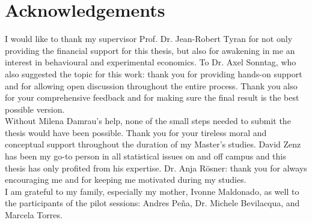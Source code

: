 \chapter*{Acknowledgements}

 I would like to thank my supervisor Prof. Dr. Jean-Robert Tyran for not only providing the financial support for this thesis, but also for awakening in me an interest in behavioural and experimental economics. To Dr. Axel Sonntag, who also suggested the topic for this work: thank you for providing hands-on support and for allowing open discussion throughout the entire process. Thank you also for your comprehensive feedback and for making sure the final result is the best possible version.\\

Without Milena Damrau’s help, none of the small steps needed to submit the thesis would have been possible. Thank you for your tireless moral and conceptual support throughout the duration of my Master’s studies. David Zenz has been my go-to person in all statistical issues on and off campus and this thesis has only profited from his expertise. Dr. Anja Rösner: thank you for always encouraging me and for keeping me motivated during my studies.\\

I am grateful to my family, especially my mother, Ivonne Maldonado, as well to the participants of the pilot sessions: Andres Peña, Dr. Michele Bevilacqua, and Marcela Torres.